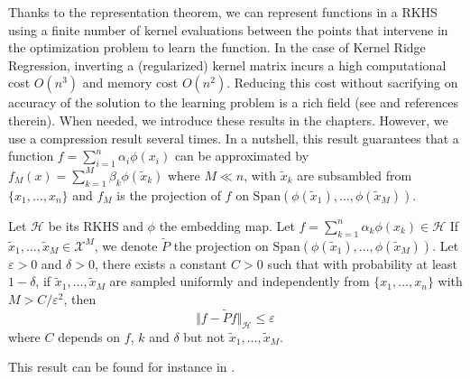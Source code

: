 Thanks to the representation theorem, we can represent functions in a RKHS using a finite number of kernel evaluations between the points that intervene in the optimization problem to learn the function. In the case of Kernel Ridge Regression, inverting a (regularized) kernel matrix incurs a high computational cost $O(n^3)$ and memory cost $O(n^2)$. Reducing this cost without sacrifying on accuracy of the solution to the learning problem is a rich field (see \cite{blanchard,rudi2015less,falkon} and references therein). When needed, we introduce these results in the chapters. However, we use a compression result several times. In a nutshell, this result guarantees that a function $f=\sum_{i=1}^n\alpha_i\phi(x_i)$ can be approximated by $f_M(x) = \sum_{k=1}^M \beta_k \phi(\tilde x_k)$ where $M \ll n$, with $\tilde x_k$ are subsambled from $\lbrace x_1, \ldots, x_n\rbrace$ and $f_M$ is the projection of $f$ on $\mathrm{Span}\left(\phi(\tilde x_1), \ldots, \phi(\tilde x_M)\right)$.

\begin{mdframed}
\begin{proposition}
Let $\mathcal H$ be its RKHS and $\phi$ the embedding map. Let $f = \sum_{k=1}^n\alpha_k \phi(x_k) \in\mathcal H$
If $\tilde x_1, \ldots, \tilde x_M \in \mathcal X^M$, we denote $\tilde P$ the projection on $\mathrm{Span}\left(\phi(\tilde x_1), \ldots, \phi(\tilde x_M)\right)$. Let $\varepsilon > 0$ and $\delta > 0$, there exists a constant $C > 0$ such that with probability at least $1-\delta$, if $\tilde x_1, \ldots, \tilde x_M$ are sampled uniformly and independently from $\lbrace x_1, \ldots, x_n\rbrace$ with $M > C / \varepsilon^2 $, then
\begin{equation}
    \Vert f - \tilde Pf \Vert_\mathcal H \leq \varepsilon
\end{equation}
where $C$ depends on $f$, $k$ and $\delta$ but not $\tilde x_1, \ldots, \tilde x_M$.
\end{proposition}
\end{mdframed}

This result can be found for instance in \cite{less-is-more}.
